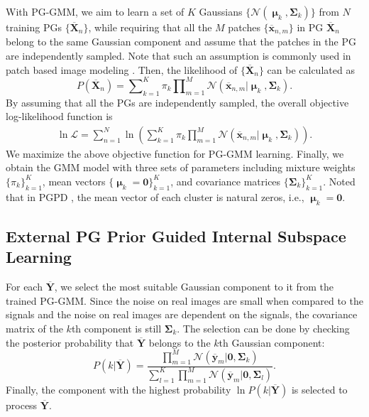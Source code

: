 \documentclass[10pt,twocolumn,letterpaper]{article}
\begin{document}
With PG-GMM, we aim to learn a set of $K$ Gaussians $\{\mathcal{N}(\boldsymbol{\upmu}_{k},\mathbf{\Sigma}_{k})\}$ from $N$ training PGs $\{\mathbf{\overline{X}}_{n}\}$, while requiring that all the $M$ patches $\{\mathbf{\overline{x}}_{n,m}\}$  in PG $\mathbf{\overline{X}}_{n}$ belong to the same Gaussian component and assume that the patches in the PG are independently sampled. Note that such an assumption is commonly used in patch based image modeling \cite{ksvd,lssc}. Then, the likelihood of $\{\mathbf{\overline{X}}_{n}\}$ can be calculated as
\begin{equation}\label{equ3}
P(\mathbf{\overline{X}}_{n})  = \sum\nolimits_{k=1}^{K}\pi_{k}\prod\nolimits_{m=1}^{M}\mathcal{N}(\mathbf{\overline{x}}_{n,m}|\boldsymbol{\upmu}_{k},\mathbf{\Sigma}_{k}).
\end{equation}
By assuming that all the PGs are independently sampled, the overall objective log-likelihood function is
\begin{equation}\label{equ4}
\begin{split}
\ln\mathcal{L}=\sum_{n=1}^{N} \ln(\sum_{k=1}^{K}\pi_{k}\prod_{m=1}^{M}\mathcal{N}(\mathbf{\overline{x}}_{n,m}|\boldsymbol{\upmu}_{k},\mathbf{\Sigma}_{k})).
\end{split}
\end{equation} 
We maximize the above objective function for PG-GMM learning. Finally, we obtain the GMM model with three sets of parameters including mixture weights $\{\pi_{k}\}_{k=1}^{K}$, mean vectors $\{\boldsymbol{\upmu}_{k}=\mathbf{0}\}_{k=1}^{K}$, and covariance matrices $\{\mathbf{\Sigma}_{k}\}_{k=1}^{K}$. Noted that in PGPD \cite{pgpd}, the mean vector of each cluster is natural zeros, i.e., $\boldsymbol{\upmu}_{k}=\mathbf{0}$.

\subsection{External PG Prior Guided Internal Subspace Learning}
For each $\mathbf{\overline{Y}}$, we select the most suitable Gaussian component to it from the trained PG-GMM. Since the noise on real images are small when compared to the signals and the noise on real images are dependent on the signals, the covariance matrix of the $k$th component is still $\mathbf{\Sigma}_{k}$. The selection can be done by checking the posterior probability that $\mathbf{\overline{Y}}$ belongs to the $k$th Gaussian component:
\begin{equation}\label{equ8}
P(k|\mathbf{\overline{Y}})=\frac{\prod_{m=1}^{M}\mathcal{N}(\mathbf{\overline{y}}_{m}|\mathbf{0},\mathbf{\Sigma}_{k})}{\sum_{l=1}^{K}\prod_{m=1}^{M}\mathcal{N}(\mathbf{\overline{y}}_{m}|\mathbf{0},\mathbf{\Sigma}_{l})}.
\end{equation}
Finally, the component with the highest probability $\ln P(k|\mathbf{\overline{Y}})$ is selected to process $\mathbf{\overline{Y}}$.
\end{document}
